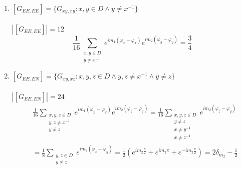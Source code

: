 \documentclass{article}
\newcommand{\abs}[1]{\left\vert #1 \right\vert}
\begin{document}
\begin{enumerate}
    \item  $[G_{EE,EE}] = \{G_{xy,xy} : x, y \in D \land y \neq x^{-1}\}$
    \\\\$\abs{[G_{EE,EE}]} = 12$
    \begin{equation}
    \frac{1}{16}
    \sum_{\substack{
        x, y \in D \\ 
        y \neq x^{-1}
    }}
        e^{i m_1 (\varphi_{x} - \varphi_{x})}
        e^{i m_2 (\varphi_{y} - \varphi_{y})}
    = \frac{3}{4}
    \end{equation}
    
    \item  $[G_{EE,EN}] = \{G_{xy,xz} : x, y, z \in D \land y, z \neq x^{-1} \land y \neq z \}$
    \\\\$\abs{[G_{EE,EN}]} = 24$
    \begin{equation}
    \begin{split}
    &\frac{1}{16}
    \sum_{\substack{
        x, y, z \in D \\ 
        y, z \neq x^{-1} \\
        y \neq z
    }}
        e^{i m_1 (\varphi_{x} - \varphi_{x})}
        e^{i m_2 (\varphi_{z} - \varphi_{y})}
    =
    \frac{1}{16}
    \sum_{\substack{
        x, y, z \in D \\ 
        y \neq z \\
        x \neq y^{-1} \\
        x \neq z^{-1} 
    }}
        e^{i m_2 (\varphi_{z} - \varphi_{y})} \\
    &=
    \frac{1}{8}
    \sum_{\substack{
        y, z \in D \\ 
        y \neq z
    }}
        e^{i m_2 (\varphi_{z} - \varphi_{y})} 
    =
    \frac{1}{2}
    \left(
        e^{i m_2 \frac{\pi}{2}} +
        e^{i m_2 \pi} +
        e^{-i m_2 \frac{\pi}{2}}
    \right) = 2\delta_{m_2} - \frac{1}{2}
    \end{split}
    \end{equation}
    

\end{enumerate}
\end{document}
